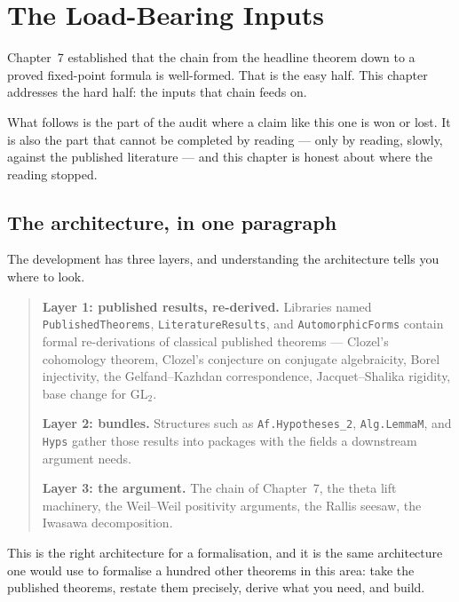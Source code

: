 
\chapter{The Load-Bearing Inputs}
\label{ch:inputs}

Chapter~7 established that the chain from the headline theorem down to a proved
fixed-point formula is well-formed. That is the easy half. This chapter
addresses the hard half: the inputs that chain feeds on.

What follows is the part of the audit where a claim like this one is won or
lost. It is also the part that cannot be completed by reading --- only by
reading, slowly, against the published literature --- and this chapter is
honest about where the reading stopped.

\section{The architecture, in one paragraph}The development has three layers, and understanding the architecture tells you
where to look.

\begin{quote}
\textbf{Layer 1: published results, re-derived.} Libraries named
\texttt{PublishedTheorems}, \texttt{LiteratureResults}, and
\texttt{AutomorphicForms} contain formal re-derivations of classical
published theorems --- Clozel's cohomology theorem, Clozel's conjecture on
conjugate algebraicity, Borel injectivity, the Gelfand--Kazhdan
correspondence, Jacquet--Shalika rigidity, base change for $\mathrm{GL}_2$.

\textbf{Layer 2: bundles.} Structures such as \texttt{Af.Hypotheses\_2},
\texttt{Alg.LemmaM},  and \texttt{Hyps}
gather those results into packages with the fields a downstream argument
needs.

\textbf{Layer 3: the argument.} The chain of Chapter~7, the theta lift
machinery, the Weil--Weil positivity arguments, the Rallis seesaw, the
Iwasawa decomposition.
\end{quote}

This is the right architecture for a formalisation, and it is the same
architecture one would use to formalise a hundred other theorems in this area:
take the published theorems, restate them precisely, derive what you need, and
build.

